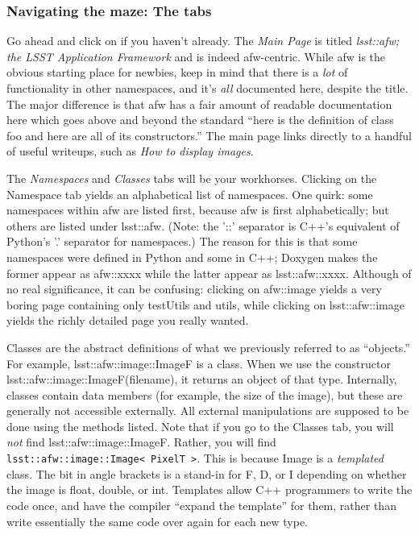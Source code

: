\subsubsection{Navigating the maze:  The tabs}

Go ahead and click on 
if you haven't already.  The {\it Main Page} is titled {\it lsst::afw; the
LSST Application Framework} and is indeed afw-centric.  While afw is
the obvious starting place for newbies, keep in mind that there is a
{\it lot} of functionality in other namespaces, and it's {\it all}
documented here, despite the title.  The major difference is that afw
has a fair amount of readable documentation here which goes above and
beyond the standard ``here is the definition of class foo and here are
all of its constructors.''  The main page links directly to a handful
of useful writeups, such as {\it How to display images}.

The {\it Namespaces} and {\it Classes} tabs will be your workhorses.
Clicking on the Namespace tab yields an alphabetical list of
namespaces.  One quirk: some namespaces within afw are listed first,
because afw is first alphabetically; but others are listed under
lsst::afw. (Note: the '::' separator is C++'s equivalent of Python's
'.' separator for namespaces.)  The reason for this is that some
namespaces were defined in Python and some in C++; Doxygen makes the
former appear as afw::xxxx while the latter appear as lsst::afw::xxxx.
Although of no real significance, it can be confusing: clicking on
afw::image yields a very boring page containing only testUtils and
utils, while clicking on lsst::afw::image yields the richly detailed
page you really wanted.  

Classes are the abstract definitions of what we previously referred to
as ``objects.'' For example, lsst::afw::image::ImageF is a class.
When we use the constructor lsst::afw::image::ImageF(filename), it
returns an object of that type.  Internally, classes contain data
members (for example, the size of the image), but these are generally
not accessible externally.  All external manipulations are supposed to
be done using the methods listed.  Note that if you go to the Classes
tab, you will {\it not} find lsst::afw::image::ImageF. Rather, you
will find \texttt{lsst::afw::image::Image< PixelT >}.  This is
because Image is a {\it templated} class.  The bit in angle brackets
is a stand-in for F, D, or I depending on whether the image is float,
double, or int.  Templates allow C++ programmers to write the code
once, and have the compiler ``expand the template'' for them, rather
than write essentially the same code over again for each new type.


